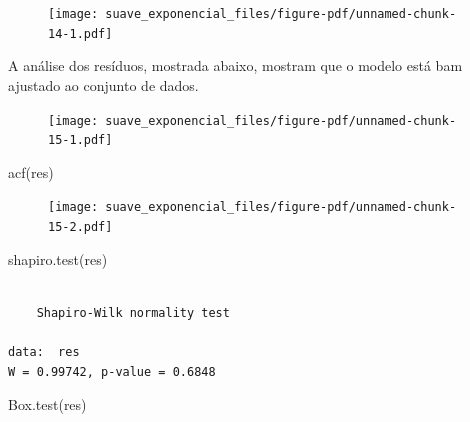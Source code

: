 \documentclass[
  letterpaper,
  DIV=11,
  numbers=noendperiod]{scrreprt}
\newenvironment{Shaded}{\begin{snugshade}}{\end{snugshade}}
\newcommand{\FunctionTok}[1]{\textcolor[rgb]{0.28,0.35,0.67}{#1}}
\newcommand{\NormalTok}[1]{\textcolor[rgb]{0.00,0.23,0.31}{#1}}
\newcommand{\OtherTok}[1]{\textcolor[rgb]{0.00,0.23,0.31}{#1}}
\newcommand{\SpecialCharTok}[1]{\textcolor[rgb]{0.37,0.37,0.37}{#1}}
\theoremstyle{definition}
\theoremstyle{plain}
\theoremstyle{definition}
\theoremstyle{plain}
\theoremstyle{remark}
\begin{document}
\begin{figure}[H]

{\centering \texttt{[image: suave\_exponencial\_files/figure-pdf/unnamed-chunk-14-1.pdf]}

}

\end{figure}

A análise dos resíduos, mostrada abaixo, mostram que o modelo está bam
ajustado ao conjunto de dados.

\begin{Shaded}
\end{Shaded}

\begin{figure}[H]

{\centering \texttt{[image: suave\_exponencial\_files/figure-pdf/unnamed-chunk-15-1.pdf]}

}

\end{figure}

\begin{Shaded}
\begin{Highlighting}[]
\FunctionTok{acf}\NormalTok{(res)}
\end{Highlighting}
\end{Shaded}

\begin{figure}[H]

{\centering \texttt{[image: suave\_exponencial\_files/figure-pdf/unnamed-chunk-15-2.pdf]}

}

\end{figure}

\begin{Shaded}
\begin{Highlighting}[]
\FunctionTok{shapiro.test}\NormalTok{(res)}
\end{Highlighting}
\end{Shaded}

\begin{verbatim}

    Shapiro-Wilk normality test

data:  res
W = 0.99742, p-value = 0.6848
\end{verbatim}

\begin{Shaded}
\begin{Highlighting}[]
\FunctionTok{Box.test}\NormalTok{(res)}
\end{Highlighting}
\end{Shaded}
\end{document}
